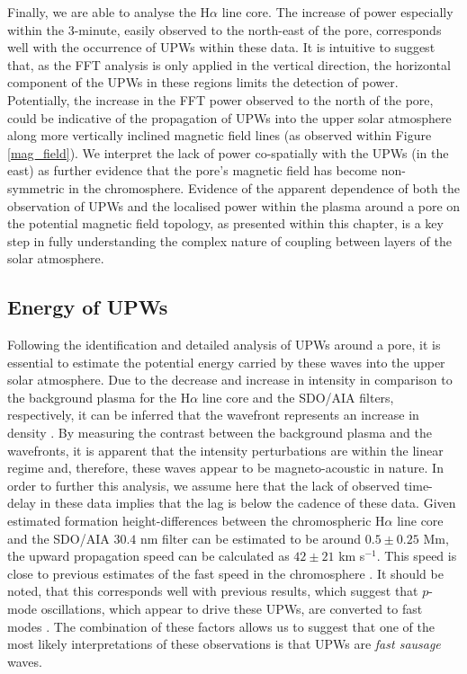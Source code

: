 	Finally, we are able to analyse the H$\alpha$ line core.
	The increase of power especially within the 3-minute, easily observed to the north-east of the pore, corresponds well with the occurrence of UPWs within these data.
	It is intuitive to suggest that, as the FFT analysis is only applied in the vertical direction, the horizontal component of the UPWs in these regions limits the detection of power.
	Potentially, the increase in the FFT power observed to the north of the pore, could be indicative of the propagation of UPWs into the upper solar atmosphere along more vertically inclined magnetic field lines (as observed within Figure \ref{mag_field}).
	We interpret the lack of power co-spatially with the UPWs (in the east) as further evidence that the pore's magnetic field has become non-symmetric in the chromosphere.
	Evidence of the apparent dependence of both the observation of UPWs and the localised power within the plasma around a pore on the potential magnetic field topology, as presented within this chapter, is a key step in fully understanding the complex nature of coupling between layers of the solar atmosphere.

\subsection{Energy of UPWs}

	Following the identification and detailed analysis of UPWs around a pore, it is essential to estimate the potential energy carried by these waves into the upper solar atmosphere.
	Due to the decrease and increase in intensity in comparison to the background plasma for the H$\alpha$ line core and the SDO/AIA filters, respectively, it can be inferred that the wavefront represents an increase in density \citep{Allen1947,Leenaarts2012}.
	By measuring the contrast between the background plasma and the wavefronts, it is apparent that the intensity perturbations are within the linear regime and, therefore, these waves appear to be magneto-acoustic in nature.
	In order to further this analysis, we assume here that the lack of observed time-delay in these data implies that the lag is below the cadence of these data.
	Given estimated formation height-differences between the chromospheric H$\alpha$ line core and the SDO/AIA $30.4$ nm filter can be estimated to be around $0.5\pm0.25$ Mm, the upward propagation speed can be calculated as $42\pm21$ km s$^{-1}$.
	This speed is close to previous estimates of the fast speed in the chromosphere \citep{Morton2012}.
	It should be noted, that this corresponds well with previous results, which suggest that $p$-mode oscillations, which appear to drive these UPWs, are converted to fast modes \citep{Vigeesh2012}.
	The combination of these factors allows us to suggest that one of the most likely interpretations of these observations is that UPWs are {\it fast sausage} waves.

